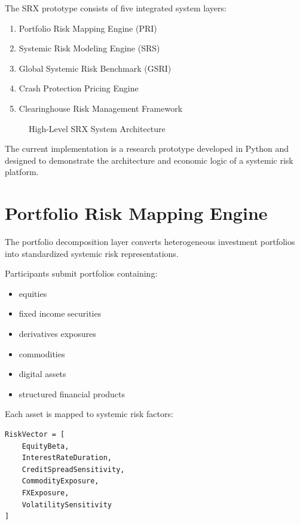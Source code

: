 \documentclass[11pt]{article}
\begin{document}
The SRX prototype consists of five integrated system layers:

\begin{enumerate}
\item Portfolio Risk Mapping Engine (PRI)
\item Systemic Risk Modeling Engine (SRS)
\item Global Systemic Risk Benchmark (GSRI)
\item Crash Protection Pricing Engine
\item Clearinghouse Risk Management Framework
\end{enumerate}

\begin{figure}[h]
\centering
{}
\caption{High-Level SRX System Architecture}
\end{figure}

The current implementation is a research prototype developed in Python and designed to demonstrate the architecture and economic logic of a systemic risk platform.

\section{Portfolio Risk Mapping Engine}

The portfolio decomposition layer converts heterogeneous investment portfolios into standardized systemic risk representations.

Participants submit portfolios containing:

\begin{itemize}
\item equities
\item fixed income securities
\item derivatives exposures
\item commodities
\item digital assets
\item structured financial products
\end{itemize}

Each asset is mapped to systemic risk factors:

\begin{verbatim}
RiskVector = [
    EquityBeta,
    InterestRateDuration,
    CreditSpreadSensitivity,
    CommodityExposure,
    FXExposure,
    VolatilitySensitivity
]
\end{verbatim}
\end{document}
